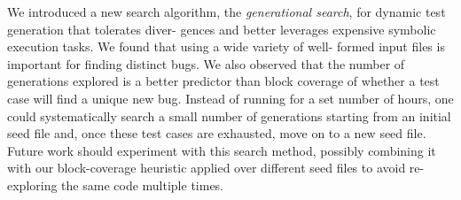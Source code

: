 We introduced a new search algorithm, the \textit{generational search}, for dynamic test generation that tolerates diver- gences and better leverages expensive symbolic execution tasks.
We found that using a wide variety of well- formed input files is important for finding distinct bugs. We also observed that the number of generations explored is a better predictor than block coverage of whether a test case will find a unique new bug.
Instead of running for a set number of hours, one could systematically search a small number of generations starting from an initial seed file and, once these test cases are exhausted, move on to a new seed file.
Future work should experiment with this search method, possibly combining it with our block-coverage heuristic applied over different seed files to avoid re-exploring the same code multiple times.